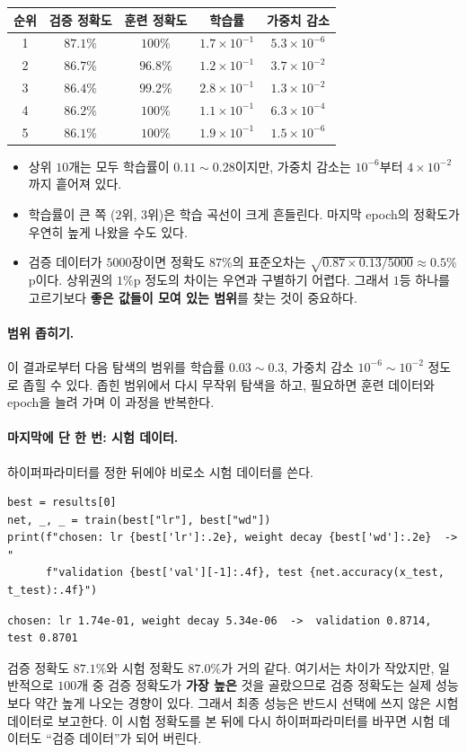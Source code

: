 \documentclass[11pt,a4paper]{article}
\begin{document}
\begin{center}
\begin{tabular}{@{}ccccc@{}}
\toprule
순위 & 검증 정확도 & 훈련 정확도 & 학습률 & 가중치 감소 \\
\midrule
1 & $87.1\%$ & $100\%$ & $1.7\times10^{-1}$ & $5.3\times10^{-6}$ \\
2 & $86.7\%$ & $96.8\%$ & $1.2\times10^{-1}$ & $3.7\times10^{-2}$ \\
3 & $86.4\%$ & $99.2\%$ & $2.8\times10^{-1}$ & $1.3\times10^{-2}$ \\
4 & $86.2\%$ & $100\%$ & $1.1\times10^{-1}$ & $6.3\times10^{-4}$ \\
5 & $86.1\%$ & $100\%$ & $1.9\times10^{-1}$ & $1.5\times10^{-6}$ \\
\bottomrule
\end{tabular}
\end{center}

\begin{itemize}[leftmargin=1.8em]
\item 상위 $10$개는 모두 학습률이 $0.11\sim0.28$이지만, 가중치 감소는 $10^{-6}$부터 $4\times10^{-2}$까지 흩어져 있다.
\item 학습률이 큰 쪽 ($2$위, $3$위)은 학습 곡선이 크게 흔들린다. 마지막 epoch의 정확도가 우연히 높게 나왔을 수도 있다.
\item 검증 데이터가 $5000$장이면 정확도 $87\%$의 표준오차는 $\sqrt{0.87\times0.13/5000}\approx0.5\%$p이다.
상위권의 $1\%$p 정도의 차이는 우연과 구별하기 어렵다.
그래서 $1$등 하나를 고르기보다 \textbf{좋은 값들이 모여 있는 범위}를 찾는 것이 중요하다.
\end{itemize}

\paragraph{범위 좁히기.}
이 결과로부터 다음 탐색의 범위를 학습률 $0.03\sim0.3$, 가중치 감소 $10^{-6}\sim10^{-2}$ 정도로 좁힐 수 있다.
좁힌 범위에서 다시 무작위 탐색을 하고, 필요하면 훈련 데이터와 epoch을 늘려 가며 이 과정을 반복한다.

\paragraph{마지막에 단 한 번: 시험 데이터.}
하이퍼파라미터를 정한 뒤에야 비로소 시험 데이터를 쓴다.
\begin{lstlisting}
best = results[0]
net, _, _ = train(best["lr"], best["wd"])
print(f"chosen: lr {best['lr']:.2e}, weight decay {best['wd']:.2e}  ->  "
      f"validation {best['val'][-1]:.4f}, test {net.accuracy(x_test, t_test):.4f}")
\end{lstlisting}
\begin{lstlisting}[language={},numbers=none]
chosen: lr 1.74e-01, weight decay 5.34e-06  ->  validation 0.8714, test 0.8701
\end{lstlisting}
검증 정확도 $87.1\%$와 시험 정확도 $87.0\%$가 거의 같다.
여기서는 차이가 작았지만, 일반적으로 $100$개 중 검증 정확도가 \textbf{가장 높은} 것을 골랐으므로
검증 정확도는 실제 성능보다 약간 높게 나오는 경향이 있다.
그래서 최종 성능은 반드시 선택에 쓰지 않은 시험 데이터로 보고한다.
이 시험 정확도를 본 뒤에 다시 하이퍼파라미터를 바꾸면 시험 데이터도 ``검증 데이터''가 되어 버린다.
\end{document}
